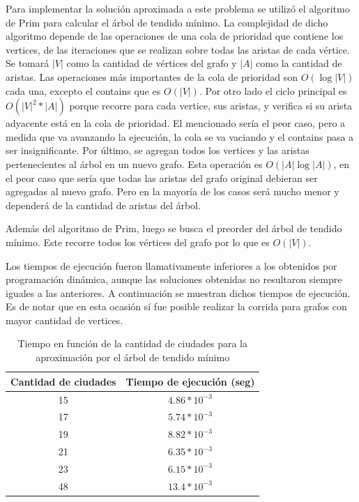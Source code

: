 \documentclass[a4paper,10pt]{article}
\begin{document}
Para implementar la solución aproximada a este problema se utilizó el algoritmo de Prim para calcular el árbol de tendido mínimo. La complejidad de dicho algoritmo depende de las operaciones de una cola de prioridad que contiene los vertices, de las iteraciones que se realizan sobre todas las aristas de cada vértice. Se tomará $|V|$ como la cantidad de vértices del grafo y $|A|$ como la cantidad de aristas. 
Las operaciones más importantes de la cola de prioridad son $O(\log{|V|})$ cada una, excepto el contains que es $O(|V|)$.
Por otro lado el ciclo principal es $O(|V|^2 *|A|)$ porque recorre para cada vertice, sus aristas, y verifica si su arista adyacente está en la cola de prioridad. El mencionado sería el peor caso, pero a medida que va avanzando la ejecución, la cola se va vaciando y el contains pasa a ser insignificante. Por último, se agregan todos los vertices y las aristas pertenecientes al árbol en un nuevo grafo. Esta operación es $O(|A| \log{|A|})$, en el peor caso que sería que todas las aristas del grafo original debieran ser agregadas al nuevo grafo. Pero en la mayoría de los casos será mucho menor y dependerá de la cantidad de aristas del árbol.

Además del algoritmo de Prim, luego se busca el preorder del árbol de tendido mínimo. Este recorre todos los vértices del grafo por lo que es $O(|V|)$.

Los tiempos de ejecución fueron llamativamente inferiores a los obtenidos por programación dinámica, aunque las soluciones obtenidas no resultaron siempre iguales a las anteriores. A continuación se muestran dichos tiempos de ejecución. Es de notar que en esta ocasión sí fue posible realizar la corrida para grafos con mayor cantidad de vertices.

\begin{table}[H]
\centering
\begin{tabular}{|c|c|}
\hline
Cantidad de ciudades	& Tiempo de ejecución (seg)\\\hline
15						& $4.86 * 10^{-3}$\\\hline
17						& $5.74 * 10^{-3}$\\\hline
19						& $8.82 * 10^{-3}$\\\hline
21						& $6.35 * 10^{-3}$\\\hline
23						& $6.15 * 10^{-3}$\\\hline
48						& $13.4 * 10^{-3}$\\\hline
\end{tabular}
\caption{Tiempo en función de la cantidad de ciudades para la aproximación por el árbol de tendido mínimo}
\label{tab:held}
\end{table}
\end{document}
